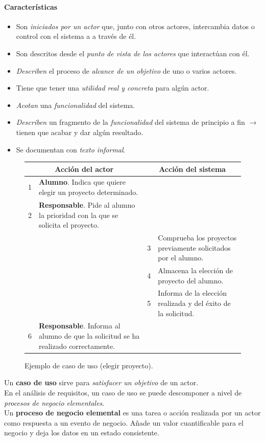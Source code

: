 \documentclass[12pt,spanish]{article}
\begin{document}
\paragraph{Características}

\begin{itemize}
	\item Son \emph{iniciados por un actor} que, junto con otros actores, intercambia datos o control con el sistema a a través de él.
	\item Son descritos desde el \emph{punto de vista de los actores} que interactúan con él.
	\item \emph{Describen} el proceso de \emph{alcance de un objetivo} de uno o varios actores.
	\item Tiene que tener una \emph{utilidad real y concreta} para algún actor.
	\item \emph{Acotan} una \emph{funcionalidad} del sistema.
	\item \emph{Describen} un fragmento de la \emph{funcionalidad} del sistema de principio a fin $\rightarrow$ tienen que acabar y dar algún resultado.
	\item Se documentan con \emph{texto informal}.
\end{itemize}

\begin{figure}[H]
\centering
\begin{tabular}{| m{3pt} | m{7cm} | m{3pt} | m{7cm} |}
\hline
\multicolumn{2}{|c|}{\textbf{Acción del actor}} & \multicolumn{2}{c|}{\textbf{Acción del sistema}} \\
\hline
1 & \textbf{Alumno}. Indica que quiere elegir un proyecto determinado. & &\\
\hline
2 & \textbf{Responsable}. Pide al alumno la prioridad con la que se solicita el proyecto. & &\\
\hline
 & & 3 & Comprueba los proyectos previamente solicitados por el alumno. \\
\hline
 & & 4 & Almacena la elección de proyecto del alumno. \\
\hline
 & & 5 & Informa de la elección realizada y del éxito de la solicitud. \\
\hline
6 &  \textbf{Responsable}. Informa al alumno de que la solicitud se ha realizado correctamente. & & \\
\hline
\end{tabular}
\caption{Ejemplo de caso de uso (elegir proyecto).}
\end{figure}

Un \textbf{caso de uso} sirve para \emph{satisfacer un objetivo} de un actor.\\
En el análisis de requisitos, un caso de uso se puede descomponer a nivel de \emph{procesos de negocio elementales}.\\
Un \textbf{proceso de negocio elemental} es una tarea o acción realizada por un actor como respuesta a un evento de negocio. Añade un valor cuantificable para el negocio y deja los datos en un estado consistente.
\end{document}
